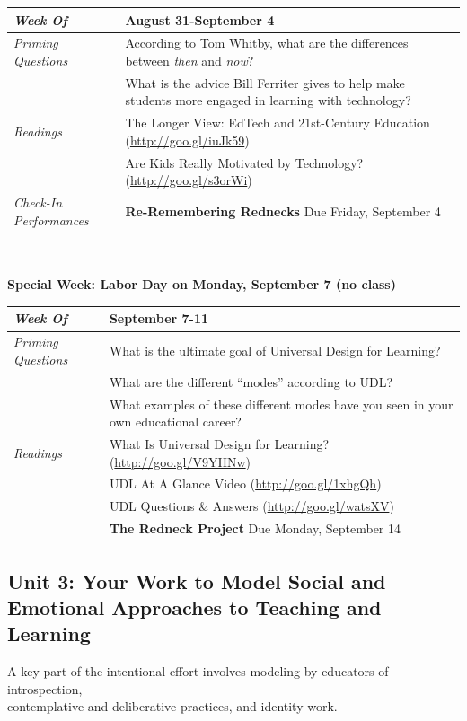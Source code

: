 \documentclass[two-side]{tufte-handout}
\newcommand{\gentopic}[1]{\begin{fullwidth}\begin{center}\faKey \textsf{#1}\end{center}\end{fullwidth}}
\newcommand{\tabpq}{\faQuestionCircle\medspace\textit{Priming Questions}}
\newcommand{\tabread}{\faBook\medspace\textit{Readings}}
\newcommand{\tabdt}{\faCalendar\medspace\textit{Week Of}}
\newcommand{\tabcheckin}{\faCheckSquareO\medspace\textit{Check-In Performances}}
\newcommand{\tabbreak}{\begin{fullwidth}\begin{center}\faAsterisk\faAsterisk\faAsterisk\\\end{center}\end{fullwidth}}
\newcommand{\specialweek}[1]{\begin{fullwidth}\begin{center}\textbf{\faBullhorn\medspace Special Week: #1 \medspace\faBullhorn}\end{center}\end{fullwidth}}
\newenvironment{tabsched}
	{\small
	\begin{tabular}{p{1.5in}p{4.5in}}
	\midrule}
	{\midrule
	\end{tabular}
	\normalsize}
\newcommand{\weekthree}{August 31-September 4}
\newcommand{\weekfour}{September 7-11}
\newcommand{\laborday}{Labor Day on Monday, September 7 (no class)}
\begin{document}
\begin{tabsched}
	\tabdt & \weekthree \\
	\midrule
	\tabpq & According to Tom Whitby, what are the differences between \textit{then} and \textit{now}? \\
	& What is the advice Bill Ferriter gives to help make students more engaged in learning with technology? \\
	\midrule
	\tabread & The Longer View: EdTech and 21st-Century Education (\url{http://goo.gl/iuJk59}) \\
	& Are Kids Really Motivated by Technology? (\url{http://goo.gl/s3orWi}) \\
	\midrule
	\tabcheckin & \textbf{Re-Remembering Rednecks} Due Friday, September 4 \\ %
\end{tabsched}

\tabbreak

\specialweek{\laborday}

\begin{tabsched}
	\tabdt & \weekfour \\
	\midrule
	\tabpq & What is the ultimate goal of Universal Design for Learning? \\
	& What are the different \enquote{modes} according to UDL? \\
	& What examples of these different modes have you seen in your own educational career? \\
	\midrule
	\tabread & What Is Universal Design for Learning? (\url{http://goo.gl/V9YHNw}) \\
	& UDL At A Glance Video (\url{http://goo.gl/1xhgQh}) \\
	& UDL Questions \& Answers (\url{http://goo.gl/watsXV}) \\
	\midrule
	\tabperfomance & \textbf{The Redneck Project} Due Monday, September 14 \\
\end{tabsched}

\newpage

\begin{fullwidth}
	\section{Unit 3: Your Work to Model Social and Emotional Approaches to Teaching and Learning}
\end{fullwidth}

\gentopic{A key part of the intentional effort involves modeling by educators of introspection,\\contemplative and deliberative practices, and identity work.}
\end{document}
